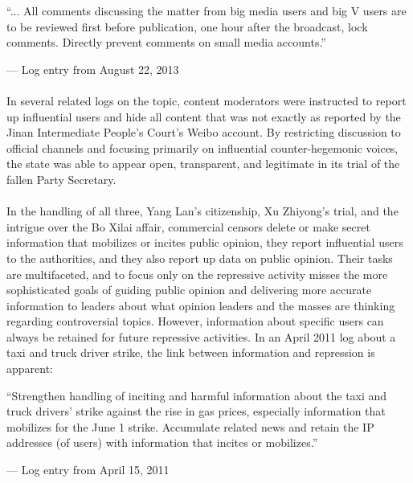 \documentclass[12pt]{article}
\begin{document}
\begin{CJK*}{UTF8}{gbsn}
{
\epigraph{``... All comments discussing the matter from big media users and big V users are to be reviewed first before publication, one hour after the broadcast, lock comments. Directly prevent comments on small media accounts.''\footnotemark\newline}{--- Log entry from August 22, 2013}}

\paragraph{} In several related logs on the topic, content moderators were instructed to report up influential users and hide all content that was not exactly as reported by the Jinan Intermediate People's Court's Weibo account. By restricting discussion to official channels and focusing primarily on influential counter-hegemonic voices, the state was able to appear open, transparent, and legitimate in its trial of the fallen Party Secretary.

\paragraph{} In the handling of all three, Yang Lan's citizenship, Xu Zhiyong's trial, and the intrigue over the Bo Xilai affair, commercial censors delete or make secret information that mobilizes or incites public opinion, they report influential users to the authorities, and they also report up data on public opinion. Their tasks are multifaceted, and to focus only on the repressive activity misses the more sophisticated goals of guiding public opinion and delivering more accurate information to leaders about what opinion leaders and the masses are thinking regarding controversial topics. However, information about specific users can always be retained for future repressive activities. In an April 2011 log about a taxi and truck driver strike, the link between information and repression is apparent:

{
\epigraph{``Strengthen handling of inciting and harmful information about the taxi and truck drivers' strike against the rise in gas prices, especially information that mobilizes for the June 1 strike. Accumulate related news and retain the IP addresses (of users) with information that incites or mobilizes.''\footnotemark\newline}{--- Log entry from April 15, 2011}}


\end{CJK*}
\end{document}

